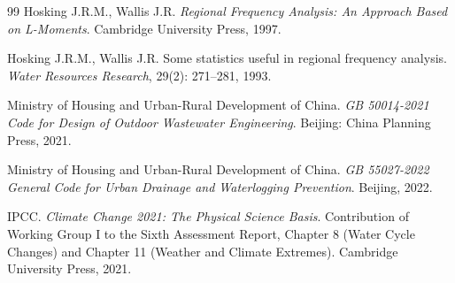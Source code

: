 \begin{thebibliography}{99}
 Hosking J.R.M., Wallis J.R. \emph{Regional Frequency Analysis: An Approach Based on L-Moments}. Cambridge University Press, 1997.

 Hosking J.R.M., Wallis J.R. Some statistics useful in regional frequency analysis. \emph{Water Resources Research}, 29(2): 271--281, 1993.

 Ministry of Housing and Urban-Rural Development of China. \emph{GB 50014-2021 Code for Design of Outdoor Wastewater Engineering}. Beijing: China Planning Press, 2021.

 Ministry of Housing and Urban-Rural Development of China. \emph{GB 55027-2022 General Code for Urban Drainage and Waterlogging Prevention}. Beijing, 2022.

 IPCC. \emph{Climate Change 2021: The Physical Science Basis}. Contribution of Working Group I to the Sixth Assessment Report, Chapter 8 (Water Cycle Changes) and Chapter 11 (Weather and Climate Extremes). Cambridge University Press, 2021.

\end{thebibliography}
